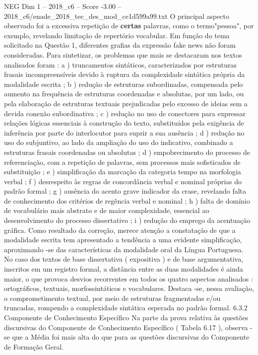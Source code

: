 \begin{textsample}{NEG Dim 1 – 2018\_c6 – Score -3.00 – 2018\_c6/enade\_2018\_tec\_des\_mod\_ce1d599a99.txt}
O principal aspecto observado foi a excessiva repetição de \textbf{certas} palavras, como o termo"pessoa", por exemplo, revelando limitação de repertório vocabular.
Em função do tema solicitado na Questão 1, diferentes grafias da expressão fake news não foram consideradas.
Para sintetizar, os problemas que mais se destacaram nos textos analisados foram : a ) truncamentos sintáticos, caracterizados por estruturas frasais incompreensíveis devido à ruptura da complexidade sintática própria da modalidade escrita ; b ) redução de estruturas subordinadas, compensada pelo aumento na frequência de estruturas coordenadas e absolutas, por um lado, ou pela elaboração de estruturas textuais prejudicadas pelo excesso de ideias sem a devida conexão subordinativa ; c ) redução no uso de conectores para expressar relações lógicas essenciais à construção do texto, substituídos pela exigência de inferência por parte do interlocutor para suprir a sua ausência ; d ) redução no uso do subjuntivo, ao lado da ampliação do uso do indicativo, combinado a estruturas frasais coordenadas ou absolutas ; d ) empobrecimento do processo de referenciação, com a repetição de palavras, sem processos mais sofisticados de substituição ; e ) simplificação da marcação da categoria tempo na morfologia verbal ; f ) desrespeito às regras de concordância verbal e nominal próprias do padrão formal ; g ) ausência do acento grave indicador da crase, revelando falta de conhecimento dos critérios de regência verbal e nominal ; h ) falta de domínio de vocabulário mais abstrato e de maior complexidade, essencial ao desenvolvimento do processo dissertativo ; i ) redução do emprego da acentuação gráfica.
Como resultado da correção, merece atenção a constatação de que a modalidade escrita tem apresentado a tendência a uma evidente simplificação, aproximando -se das características da modalidade oral da Língua Portuguesa.
No caso dos textos de base dissertativa ( expositiva ) e de base argumentativa, inscritos em um registro formal, a distância entre as duas modalidades é ainda maior, o que provoca desvios recorrentes em todos os quatro aspectos analisados : ortográficos, textuais, morfossintáticos e vocabulares.
Destaca -se, nessa avaliação, o comprometimento textual, por meio de estruturas fragmentadas e/ou truncadas, rompendo a complexidade sintática esperada no padrão formal. 6.3.2 Componente de Conhecimento Específico Na parte da prova relativa às questões discursivas do Componente de Conhecimento Específico ( Tabela 6.17 ), observa -se que a Média foi mais alta do que para as questões discursivas do Componente de Formação Geral.

\end{textsample}
